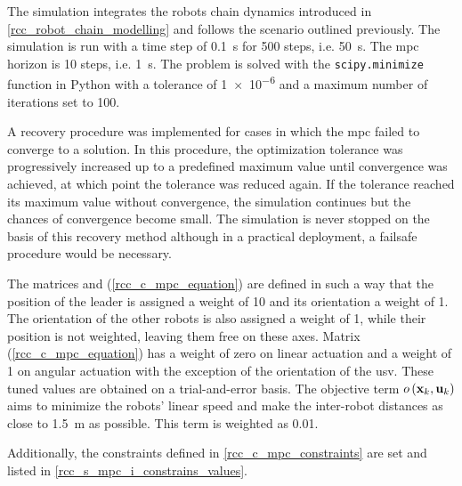 The simulation integrates the robots chain dynamics introduced in \cref{rcc_robot_chain_modelling}
and follows the scenario outlined previously. The simulation is run with a time step of
\qty{0.1}{\second} for \num{500} steps, i.e. \qty{50}{\second}. The \ac{mpc} horizon is \num{10}
steps, i.e. \qty{1}{\second}. The problem is solved with the \texttt{scipy.minimize} function in
Python with a tolerance of \num{1e-6} and a maximum number of iterations set to \num{100}.

A recovery procedure was implemented for cases in which the \ac{mpc} failed to converge to a
solution. In this procedure, the optimization tolerance was progressively increased up to a
predefined maximum value until convergence was achieved, at which point the tolerance was reduced
again. If the tolerance reached its maximum value without convergence, the simulation continues but
the chances of convergence become small. The simulation is never stopped on the basis of this
recovery method although in a practical deployment, a failsafe procedure would be necessary.

The matrices  and  (\cref{rcc_c_mpc_equation}) are defined in such a way that the
position of the leader is assigned a weight of \num{10} and its orientation a weight of \num{1}.
The orientation of the other robots is also assigned a weight of \num{1}, while their position is
not weighted, leaving them free on these axes. Matrix  (\cref{rcc_c_mpc_equation}) has a
weight of zero on linear actuation and a weight of \num{1} on angular actuation with the exception
of the orientation of the \ac{usv}. These tuned values are obtained on a trial-and-error basis. The
objective term $o\left(\ldvect{x}{k}, \ldvect{u}{k}\right)$ aims to minimize the robots' linear
speed and make the inter-robot distances as close to \qty{1.5}{\m} as possible. This term is
weighted as \num{0.01}.

Additionally, the constraints defined in \cref{rcc_c_mpc_constraints} are set and listed in
\cref{rcc_s_mpc_i_constrains_values}.

